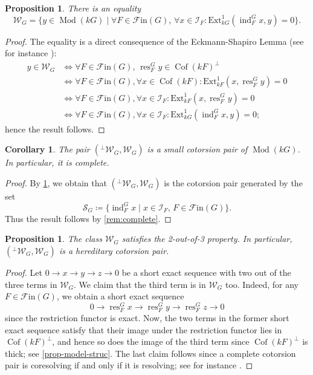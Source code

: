 \documentclass{amsart}
\newcommand{\res}{\operatorname{res}\nolimits}
\newcommand{\ind}{\operatorname{ind}\nolimits}
\def \Fin{{\mathcal{F}\textrm{in}}}
\def \Wfin{{\mathcal W}_{G}}
\DeclareMathOperator{\Mod}{Mod}
\DeclareMathOperator{\Cof}{Cof}
\numberwithin{equation}{section}%
\newtheorem{proposition}[equation]{Proposition}
\newtheorem{corollary}[equation]{Corollary}
\theoremstyle{remark}
\begin{document}
\begin{proposition}\label{prop-equality-wfin}
    There is an equality 
    \[
    \Wfin=\{y\in \Mod(kG)\mid \forall F\in \Fin(G), \, \forall x\in \mathcal{I}_F : \mathrm{Ext}^1_{kG}(\ind_F^Gx,y)=0\}. 
    \]
\end{proposition}

\begin{proof}
    The equality is a direct consequence of the Eckmann-Shapiro Lemma (see for instance \cite[Corollary 2.8.4]{Ben98}): 
    \begin{align*}
        y\in \Wfin & \iff \forall F\in \Fin(G), \, \res^G_Fy\in \Cof(kF)^\perp \\
        & \iff \forall F\in \Fin(G), \forall x\in \Cof(kF) : \mathrm{Ext}^1_{kF}(x,\res^G_Fy)=0 \\ 
        & \iff  \forall F\in \Fin(G), \forall x\in \mathcal{I}_F : \mathrm{Ext}^1_{kF}(x,\res^G_Fy)=0\\
        & \iff  \forall F\in \Fin(G), \forall x\in \mathcal{I}_F : \mathrm{Ext}^1_{kG}(\ind_F^G x,y)=0;
    \end{align*}
hence the result follows. 
\end{proof}

\begin{corollary}\label{coro-wfin-complete}
    The pair $({}^\perp\Wfin,\Wfin)$ is a small cotorsion pair of $\Mod(kG)$. In particular, it is complete.  
\end{corollary}

\begin{proof}
    By \cref{prop-equality-wfin}, we obtain that $({}^\perp\Wfin,\Wfin)$ is the cotorsion pair {generated by} the set 
    \[
    \mathcal{S}_G\coloneqq \{\ind_F^G x\mid x\in \mathcal{I}_F,\, F\in \Fin(G)\}. 
    \]
    Thus the result follows by  \cref{rem:complete}.
\end{proof}

\begin{proposition}\label{prop-Wfin-hereditary}
    The class $\Wfin$ satisfies the 2-out-of-3 property. In particular, $({}^\perp\Wfin,\Wfin)$ is a hereditary cotorsion pair. 
\end{proposition}

\begin{proof}
Let $0\to x\to y\to z \to 0$ be a short exact sequence  with two out of the three terms  in $ \Wfin$. We claim that the third term is in $\Wfin$ too. Indeed, for any $F\in \Fin(G)$, we obtain a short exact sequence 
\[
0 \to \res^G_F x\to \res^G_F y\to \res^G_F z\to 0
\]
since the restriction functor is exact. Now, the two terms in the former short exact sequence satisfy that their image under the restriction functor lies in $\Cof(kF)^\perp$,  and hence so does the image of the third term since $\Cof(kF)^\perp$ is thick; see \cref{prop-model-struc}. The last claim follows since a complete cotorsion pair is coresolving if and only if it is resolving; see for instance \cite[Corollary 1.1.12]{Bec14}.
\end{proof}
\end{document}
